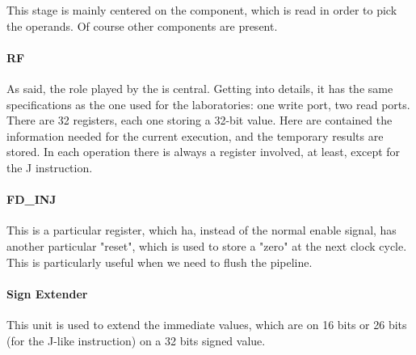 This stage is mainly centered on the \rf component, which is read in order to pick the operands. Of course other components are present.

\paragraph{RF}
As said, the role played by the \rf is central. Getting into details, it has the same specifications as the one used for the laboratories: one write port, two read ports. There are 32 registers, each one storing a 32-bit value. Here are contained the information needed for the current execution, and the temporary results are stored. In each operation there is always a register involved, at least, except for the \textsc{J} instruction.

\paragraph{FD\_INJ}
This is a particular register, which ha, instead of the normal enable signal, has another particular "reset", which is used to store a "zero" at the next clock cycle. This is particularly useful when we need to flush the pipeline.

\paragraph{Sign Extender}
This unit is used to extend the immediate values, which are on 16 bits or 26 bits (for the \textsc{J}-like instruction) on a 32 bits signed value.

